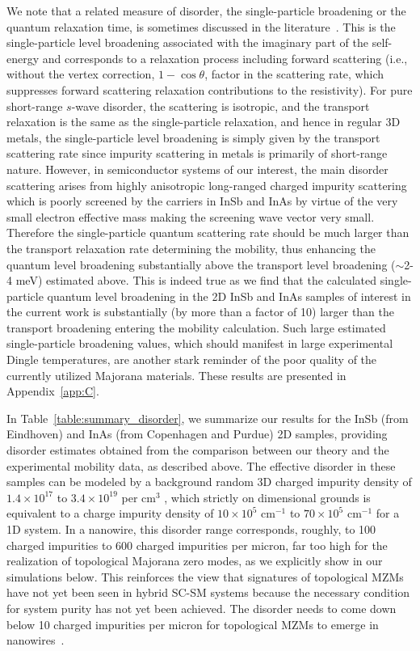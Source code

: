 \documentclass[aps,prmaterials,twocolumn,superscriptaddress,longbibliography]{revtex4-2}
\begin{document}
We note that a related measure of disorder, the single-particle broadening or the quantum relaxation time, is sometimes discussed in the literature~\cite{dassarma1985singleparticle, hwang2008singleparticle, dassarma2014mobility}.  This is the single-particle level broadening associated with the imaginary part of the self-energy and corresponds to a relaxation process including forward scattering (i.e., without the vertex correction, $ 1-\cos\theta $, factor in the scattering rate, which suppresses forward scattering relaxation contributions to the resistivity).  For pure short-range $ s $-wave disorder, the scattering is isotropic, and the transport relaxation is the same as the single-particle relaxation, and hence in regular 3D metals, the single-particle level broadening is simply given by the transport scattering rate since impurity scattering in metals is primarily of short-range nature.  However, in semiconductor systems of our interest, the main disorder scattering arises from highly anisotropic long-ranged charged impurity scattering which is poorly screened by the carriers in InSb and InAs by virtue of the very small electron effective mass making the screening wave vector very small.  Therefore the single-particle quantum scattering rate should be much larger than the transport relaxation rate determining the mobility, thus enhancing the quantum level broadening substantially above the transport level broadening ($\sim$2-4 meV) estimated above.  This is indeed true as we find that the calculated single-particle quantum level broadening in the 2D InSb and InAs samples of interest in the current work is substantially (by more than a factor of 10) larger than the transport broadening entering the mobility calculation. Such large estimated single-particle broadening values, which should manifest in large experimental Dingle temperatures, are another stark reminder of the poor quality of the currently utilized Majorana materials. These results are presented in Appendix~\ref{app:C}. 

In Table~\ref{table:summary_disorder}, we summarize our results for the InSb (from Eindhoven) and InAs (from Copenhagen and Purdue) 2D samples, providing disorder estimates obtained from the comparison between our theory and the experimental mobility data, as described above.  The effective disorder in these samples can be modeled by a background random 3D charged impurity density of $ 1.4\times10^{17} $  to $ 3.4\times10^{19} $  per cm$ ^3 $ , which strictly on dimensional grounds is equivalent to a charge impurity density of $ 10\times10^5 $  cm$ ^{-1} $  to $ 70\times10^5 $  cm$ ^{-1} $  for a 1D system.  In a nanowire, this disorder range corresponds, roughly, to 100 charged impurities to 600 charged impurities per micron, far too high for the realization of topological Majorana zero modes, as we explicitly show in our simulations below. This reinforces the view that signatures of topological MZMs have not yet been seen in hybrid SC-SM systems because the necessary condition for system purity has not yet been achieved. The disorder needs to come down below 10 charged impurities per micron for topological MZMs to emerge in nanowires~\cite{woods2021charge}.
\end{document}
